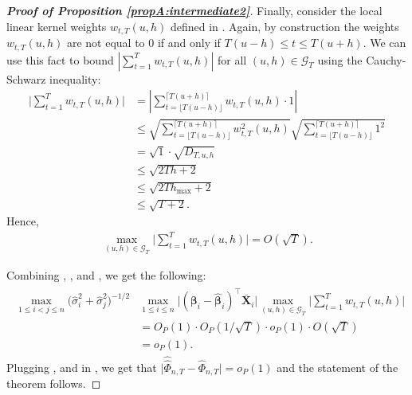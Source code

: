 \documentclass[a4paper,12pt]{article}
\makeatletter
\renewcommand{\eqref}[1]{\tagform@{\ref{#1}}}
\newcommand{\doublehattwo}[1]{\widehat{\widehat{#1}}}
\makeatother
\begin{document}
\begin{proof}[\textnormal{\textbf{Proof of Proposition \ref{propA:intermediate2}}}]
Finally, consider the local linear kernel weights $w_{t,T}(u,h)$ defined in \eqref{eq:weights}. Again, by construction the weights $w_{t, T}(u, h)$ are not equal to $0$ if and only if \linebreak $T(u-h) \le t \le T(u+h)$. We can use this fact to bound  $\left| \sum_{t=1}^T w_{t,T}(u,h)  \right|$ for all $(u, h) \in \mathcal{G}_T$ using the Cauchy-Schwarz inequality:
\begin{align*}
\Big| \sum_{t=1}^T w_{t,T}(u,h)   \Big| & = \left| \sum_{t=\lfloor T(u-h) \rfloor}^{\lceil T(u+h) \rceil} w_{t,T}(u,h) \cdot 1  \right|  \\
&\leq \sqrt{\sum_{t=\lfloor T(u-h) \rfloor}^{\lceil T(u+h) \rceil} w^2_{t,T}(u,h)}\sqrt{\sum_{t=\lfloor T(u-h) \rfloor}^{\lceil T(u+h) \rceil} 1^2}\\
&=\sqrt{1}\cdot\sqrt{D_{T, u, h}} \\
&  \leq \sqrt{2Th + 2} \\
&\leq \sqrt{2Th_{\max} +2} \\
&\leq\sqrt{T+2}.
\end{align*}
Hence, 
\begin{align}\label{ineq-diff-13}
\max_{(u,h) \in \mathcal{G}_T}  \Big| \sum_{t=1}^T w_{t,T}(u,h)  \Big| = O(\sqrt{T}).
\end{align}

Combining \eqref{ineq-diff-11}, \eqref{ineq-diff-12}, \eqref{eq:proof12} and \eqref{ineq-diff-13}, we get the following:
\begin{align}\label{ineq-diff-14}
\begin{split}
\max_{1\le i < j \le n} \big(\widehat{\sigma}_i^2+ \widehat{\sigma}_j^2 \big)^{-1/2}&\max_{1\le i  \le n}\big|(\bm{\beta}_i - \widehat{\bm{\beta}}_i)^\top\bar{\mathbf{X}}_{i}\big| \max_{(u,h) \in \mathcal{G}_T}  \Big| \sum_{t=1}^T w_{t,T}(u,h)  \Big|   \\
&=O_P(1) \cdot O_P(1/\sqrt{T}) \cdot o_P(1) \cdot O(\sqrt{T})\\
& = o_P(1).
\end{split}
\end{align}
Plugging \eqref{ineq-diff-5}, \eqref{ineq-diff-10} and \eqref{ineq-diff-14} in \eqref{ineq-diff-1}, we get that $\big|\doublehattwo{\Phi}_{n,T} - \widehat{\Phi}_{n,T}\big| = o_P(1)$ and the statement of the theorem follows.
\end{proof}
\end{document}
